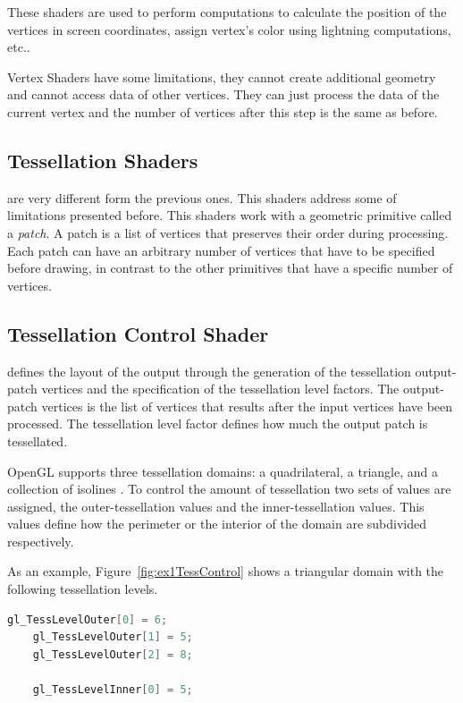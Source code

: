 These shaders are used to perform computations to calculate the position of the vertices in screen coordinates, assign vertex's color using lightning computations, etc..

Vertex Shaders have some limitations, they cannot create additional geometry and cannot access data of other vertices. They can just process the data of the current vertex and the number of vertices after this step is the same as before.


\subsection{Tessellation Shaders} %
\label{sub:tesselation_shaders}
are very different form the previous ones. This shaders address some of limitations presented before.
This shaders work with a geometric primitive called a \emph{patch}. A patch is a list of vertices that preserves their order during processing. Each patch can have an arbitrary number of vertices that have to be specified before drawing, in contrast to the other primitives that have a specific number of vertices.

\subsection{Tessellation Control Shader} %
\label{sub:tesselation_control_shader}
	 defines the layout of the output through the generation of the tessellation output-patch vertices and the specification of the tessellation level factors. The output-patch vertices is the list of vertices that results after the input vertices have been processed. The tessellation level factor defines how much the output patch is tessellated. 

	OpenGL supports three tessellation domains: a quadrilateral, a triangle, and a collection of isolines \cite{shreiner2013opengl}. To control the amount of tessellation two sets of values are assigned, the outer-tessellation values and the inner-tessellation values. This values define how the perimeter or the interior of the domain are subdivided respectively. 

	As an example, Figure~\ref{fig:ex1TessControl} shows a triangular domain with the following tessellation levels. 
	\begin{lstlisting}[frame=single,language=C]
	gl_TessLevelOuter[0] = 6;
	gl_TessLevelOuter[1] = 5;
	gl_TessLevelOuter[2] = 8;

	gl_TessLevelInner[0] = 5;
	\end{lstlisting}

